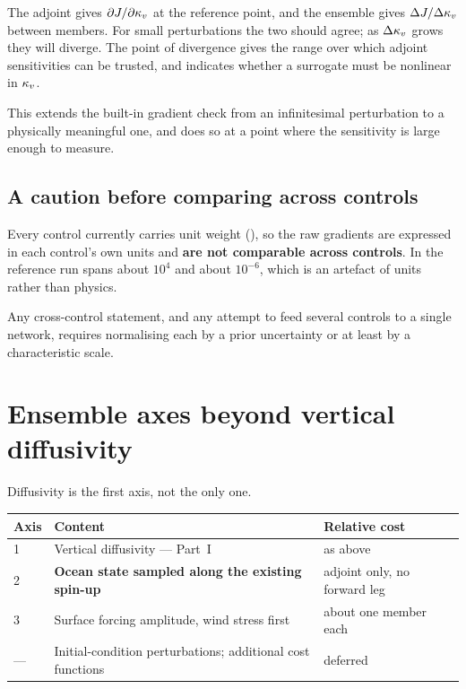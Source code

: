 The adjoint gives $\partial J/\partial\kappa_{v}$ at the reference point, and the
ensemble gives $\Delta J/\Delta\kappa_{v}$ between members. For small perturbations the
two should agree; as $\Delta\kappa_{v}$ grows they will diverge. The point of divergence
gives the range over which adjoint sensitivities can be trusted, and indicates
whether a surrogate must be nonlinear in $\kappa_{v}$.

This extends the built-in gradient check from an infinitesimal perturbation to a
physically meaningful one, and does so at a point where the sensitivity is large
enough to measure.

\subsection{A caution before comparing across controls}

Every control currently carries unit weight
(), so the raw gradients are expressed in
each control's own units and \textbf{are not comparable across controls}. In the
reference run  spans about $10^{4}$ and  about
$10^{-6}$, which is an artefact of units rather than physics.

Any cross-control statement, and any attempt to feed several controls to a single
network, requires normalising each by a prior uncertainty or at least by a
characteristic scale.

\section{Ensemble axes beyond vertical diffusivity}

Diffusivity is the first axis, not the only one.

\begin{center}
\begin{tabularx}{\textwidth}{@{}Y{0.3}Y{1.8}Y{0.9}@{}}
\toprule
\textbf{Axis} & \textbf{Content} & \textbf{Relative cost}\\
 & Vertical diffusivity --- Part~I & as above\\
2 & \textbf{Ocean state sampled along the existing spin-up}
  & adjoint only, no forward leg\\
3 & Surface forcing amplitude, wind stress first & about one member each\\
--- & Initial-condition perturbations; additional cost functions & deferred\\
\bottomrule
\end{tabularx}
\end{center}


